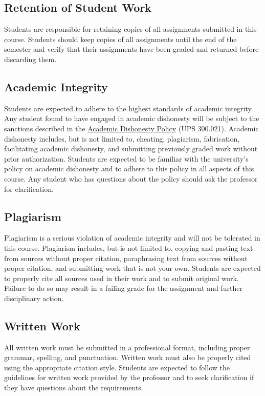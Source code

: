 \documentclass[12pt, letterpaper]{article}
\begin{document}
\subsection*{Retention of Student Work}
Students are responsible for retaining copies of all assignments submitted in this course. Students should keep copies of all assignments until the end of the semester and verify that their assignments have been graded and returned before discarding them.

\subsection*{Academic Integrity}
Students are expected to adhere to the highest standards of academic integrity. Any student found to have engaged in academic dishonesty will be subject to the sanctions described in the \href{https://www.fullerton.edu/senate/publications_policies_resolutions/ups/UPS%20300/UPS%20300.021.pdf}{Academic Dishonesty Policy} (UPS 300.021). Academic dishonesty includes, but is not limited to, cheating, plagiarism, fabrication, facilitating academic dishonesty, and submitting previously graded work without prior authorization. Students are expected to be familiar with the university's policy on academic dishonesty and to adhere to this policy in all aspects of this course. Any student who has questions about the policy should ask the professor for clarification.

\subsection*{Plagiarism}
Plagiarism is a serious violation of academic integrity and will not be tolerated in this course. Plagiarism includes, but is not limited to, copying and pasting text from sources without proper citation, paraphrasing text from sources without proper citation, and submitting work that is not your own. Students are expected to properly cite all sources used in their work and to submit original work. Failure to do so may result in a failing grade for the assignment and further disciplinary action.

\subsection*{Written Work}
All written work must be submitted in a professional format, including proper grammar, spelling, and punctuation. Written work must also be properly cited using the appropriate citation style. Students are expected to follow the guidelines for written work provided by the professor and to seek clarification if they have questions about the requirements.
\end{document}
